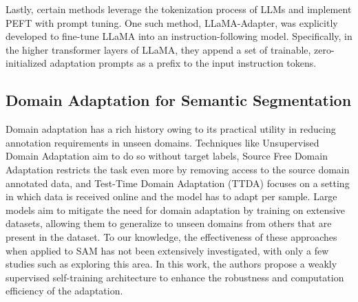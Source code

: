 Lastly, certain methods leverage the tokenization process of LLMs and implement PEFT with prompt tuning. One such method, LLaMA-Adapter, was explicitly developed to fine-tune LLaMA into an instruction-following model. Specifically, in the higher transformer layers of LLaMA, they append a set of trainable, zero-initialized adaptation prompts as a prefix to the input instruction tokens. 

\subsection{Domain Adaptation for Semantic Segmentation}
Domain adaptation has a rich history owing to its practical utility in reducing annotation requirements in unseen domains. Techniques like Unsupervised Domain Adaptation aim to do so without target labels, Source Free Domain Adaptation restricts the task even more by removing access to the source domain annotated data, and Test-Time Domain Adaptation (TTDA) focuses on a setting in which data is received online and the model has to adapt per sample. Large models aim to mitigate the need for domain adaptation by training on extensive datasets, allowing them to generalize to unseen domains from others that are present in the dataset. To our knowledge, the effectiveness of these approaches when applied to SAM has not been extensively investigated, with only a few studies such as  exploring this area. In this work, the authors propose a weakly supervised self-training architecture to enhance the robustness and computation efficiency of the adaptation.
